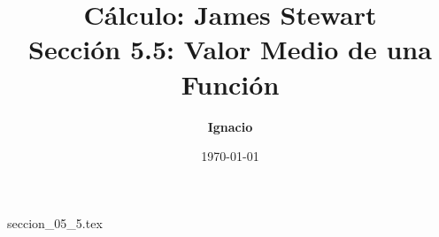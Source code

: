 \documentclass[11pt,spanish,oneside]{report}
\title{\textbf{Cálculo: James Stewart} \\ \Large Sección 5.5: Valor Medio de una Función}
\author{\textbf{Ignacio}}
\date{\today}
\begin{document}
\maketitle

{seccion_05_5.tex}
\end{document}
